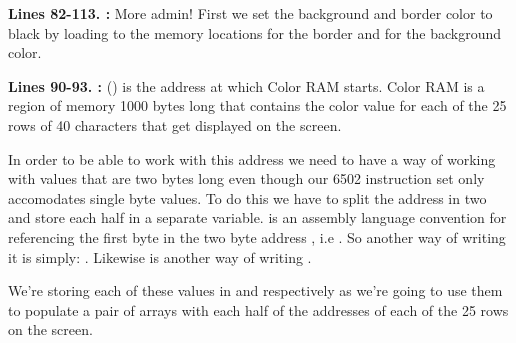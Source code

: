 \textbf{Lines 82-113. :} More admin!  First we set the background and border color to black by loading
 to the memory locations  for the border and  for the background color.

\bigskip
\bigskip
\textbf{Lines 90-93. :}  () is the address at which Color RAM starts. Color
RAM is a region of memory 1000 bytes long that contains the color value for each of the 25 rows of 40 characters that get displayed on the
screen. 

In order to be able to work with this address we need to have a way of working with values that are two bytes long even though
our 6502 instruction set only accomodates single byte values. To do this we have to split the address in two and store each half in 
a separate variable.  is an assembly language convention for referencing the first byte in the two byte address
, i.e . So another way of writing it is simply: . Likewise  is
another way of writing . 

We're storing each of these values in  and  respectively
as we're going to use them to populate a pair of arrays with each half of the addresses of each of the 25 rows on the screen.


